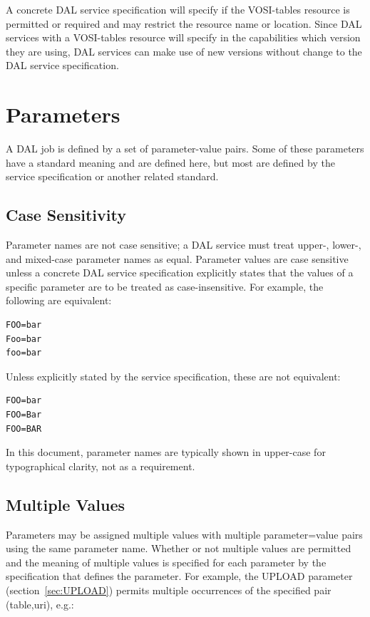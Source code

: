 \documentclass[11pt,letter]{ivoa}
\begin{document}
A concrete DAL service specification will specify if the VOSI-tables resource is 
permitted or required and may restrict the resource name or location.
Since DAL services with a VOSI-tables resource will specify 
in the capabilities which version they are using, DAL services can make use of 
new versions without change to the DAL service specification.

\section{Parameters}
\label{sec:parameters}
A DAL job is defined by a set of parameter-value pairs. Some of these parameters 
have a standard meaning and are defined here, but most are defined by the 
service specification or another related standard. 

\subsection{Case Sensitivity}
Parameter names are not case sensitive; a DAL service must treat
\hbox{upper-,} \hbox{lower-,} 
and mixed-case parameter names as equal. Parameter values are case sensitive 
unless a concrete DAL service specification explicitly states that the values of 
a specific parameter are to be treated as case-insensitive. For example, the 
following are equivalent:

\begin{verbatim}
FOO=bar
Foo=bar
foo=bar
\end{verbatim}

Unless explicitly stated by the service specification, these are not equivalent:

\begin{verbatim}
FOO=bar
FOO=Bar
FOO=BAR
\end{verbatim}

In this document, parameter names are typically shown in upper-case for 
typographical clarity, not as a requirement.

\subsection{Multiple Values}
Parameters may be assigned multiple values with multiple parameter=value pairs 
using the same parameter name. Whether or not multiple values are permitted and 
the meaning of multiple values is specified for each parameter by the 
specification that defines the parameter. For example, the UPLOAD parameter 
(section~\ref{sec:UPLOAD}) permits multiple occurrences of the specified 
pair (table,uri), e.g.:
\end{document}
